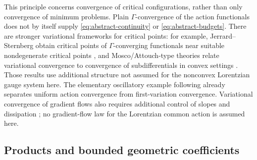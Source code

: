 \documentclass[11pt]{article}
\numberwithin{equation}{section}
\theoremstyle{definition}
\theoremstyle{remark}
\begin{document}
This principle concerns convergence of critical configurations, rather than
only convergence of minimum problems.  Plain $\Gamma$-convergence of the
action functionals \cite{DalMaso1993,Braides2002} does not by itself supply
\eqref{eq:abstract-continuity} or \eqref{eq:abstract-budgets}.  There are
stronger variational frameworks for critical points: for example,
Jerrard--Sternberg obtain critical points of $\Gamma$-converging functionals
near suitable nondegenerate critical points \cite{JerrardSternberg2009}, and
Mosco/Attouch-type theories relate variational convergence to convergence of
subdifferentials in convex settings \cite{Attouch1984}.  Those results use
additional structure not assumed for the nonconvex Lorentzian gauge system
here.  The elementary oscillatory example following 
already separates uniform action convergence from first-variation
convergence.  Variational convergence of gradient flows also requires
additional control of slopes and dissipation \cite{SandierSerfaty2004}; no
gradient-flow law for the Lorentzian common action is assumed here.

\subsection{Products and bounded geometric coefficients}
\end{document}
